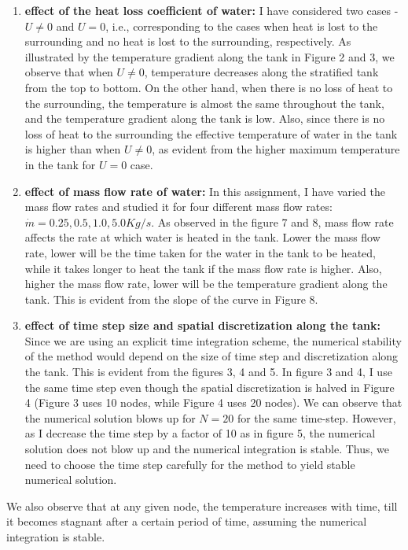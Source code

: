 \documentclass{article}
\begin{document}
\begin{enumerate}
\item
\textbf{effect of the heat loss coefficient of water:} I have considered two cases - $U \neq 0$ and $U = 0$, i.e., corresponding to the cases when heat is lost to the surrounding and no heat is lost to the surrounding, respectively. As illustrated by the temperature gradient along the tank in Figure 2 and 3, we observe that when $U \neq 0$, temperature decreases along the stratified tank from the top to bottom. On the other hand, when there is no loss of heat to the surrounding, the temperature is almost the same throughout the tank, and the temperature gradient along the tank is low. Also, since there is no loss of heat to the surrounding the effective temperature of water in the tank is higher than when $U \neq 0$, as evident from the higher maximum temperature in the tank for $U = 0$ case.

\item
\textbf{effect of mass flow rate of water:}
In this assignment, I have varied the mass flow rates and studied it for four different mass flow rates: $\dot{m} = 0.25, 0.5, 1.0, 5.0 Kg/s$. As observed in the figure 7 and 8, mass flow rate affects the rate at which water is heated in the tank. Lower the mass flow rate, lower will be the time taken for the water in the tank to be heated, while it takes longer to heat the tank if the mass flow rate is higher. Also, higher the mass flow rate, lower will be the temperature gradient along the tank. This is evident from the slope of the curve in Figure 8. 

\item
\textbf{effect of time step size and spatial discretization along the tank:}
Since we are using an explicit time integration scheme, the numerical stability of the method would depend on the size of time step and discretization along the tank. This is evident from the figures 3, 4 and 5. In figure 3 and 4, I use the same time step even though the spatial discretization is halved in Figure 4 (Figure 3 uses 10 nodes, while Figure 4 uses 20 nodes). We can observe that the numerical solution blows up for $N = 20$ for the same time-step. However, as I decrease the time step by a factor of 10 as in figure 5, the numerical solution does not blow up and the numerical integration is stable. Thus, we need to choose the time step carefully for the method to yield stable numerical solution.

\end{enumerate}
We also observe that at any given node, the temperature increases with time, till it becomes stagnant after a certain period of time, assuming the numerical integration is stable.
\end{document}
